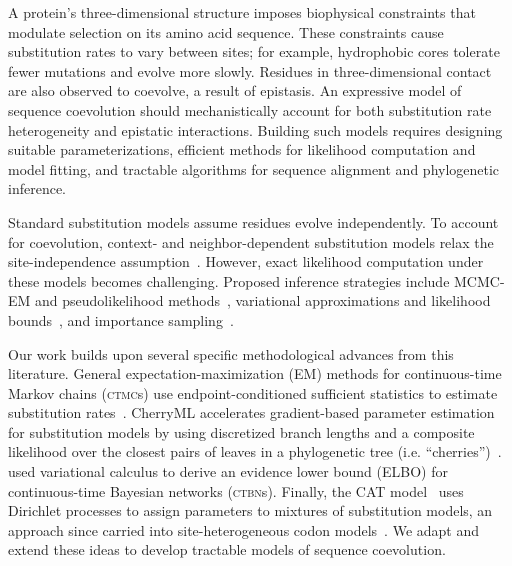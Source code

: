 \documentclass[11pt]{article}
\newcommand{\CTBN}{\textsc{ctbn}}
\newcommand{\CTMC}{\textsc{ctmc}}
\begin{document}
A protein's three-dimensional structure imposes biophysical constraints that modulate selection on its amino acid sequence.
These constraints cause substitution rates to vary between sites; for example, hydrophobic cores tolerate fewer mutations and evolve more slowly.
Residues in three-dimensional contact are also observed to coevolve, a result of epistasis.
An expressive model of sequence coevolution should mechanistically account for both substitution rate heterogeneity and epistatic interactions.
Building such models requires designing suitable parameterizations, efficient methods for likelihood computation and model fitting, and tractable algorithms for sequence alignment and phylogenetic inference.

Standard substitution models assume residues evolve independently.
To account for coevolution, context- and neighbor-dependent substitution models relax the site-independence assumption~\citep{ArndtBurgeHwa2003NeighborDependent,JensenPedersen2000ContextDependent,LunterHein2004NearestNeighbor,SiepelHaussler2004ContextML}.
However, exact likelihood computation under these models becomes challenging.
Proposed inference strategies include MCMC-EM and pseudolikelihood
methods~\citep{ChristensenHobolthJensen2005PseudoLikelihood,Hobolth2008MCMCEM},
variational approximations and likelihood bounds~\citep{cohn2010,JojicEtAl2004PhyloHMM,MatsenRalph2022BoundingDependency,WexlerGeiger2007VariationalUpper},
and importance sampling~\citep{MathewsSchmidler2025ImportanceSampling}.

Our work builds upon several specific methodological advances from this literature.
General expectation-maximization (EM) methods for continuous-time Markov
chains (\CTMC s) use endpoint-conditioned sufficient statistics to estimate substitution
rates~\citep{HolmesRubin2002,HobolthJensen2005,HobolthJensen2011}.
CherryML accelerates gradient-based parameter estimation for substitution models by using discretized
branch lengths and a composite likelihood over the closest pairs of leaves in a phylogenetic tree (i.e. ``cherries'')~\citep{Prillo2023CherryML}.
\citet{cohn2010} used variational calculus to derive an evidence lower bound (ELBO) for continuous-time Bayesian networks (\CTBN s).
Finally, the CAT model~\citep{Lartillot2004} uses Dirichlet processes to assign parameters to mixtures of substitution models, an approach since carried into site-heterogeneous codon models~\citep{rodrigue2021}.
 We adapt and extend these ideas to develop tractable models of sequence coevolution.
\end{document}
